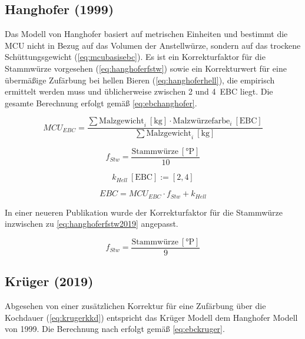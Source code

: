 \documentclass[a4paper,parskip=half]{scrartcl}
\newcommand{\MCUEBC}{\mathit{MCU}_{EBC}}
\newcommand{\EBC}{\mathit{EBC}}
\newcommand{\uebc}{\:[\textrm{EBC}]}
\newcommand{\ukg}{\:[\textrm{kg}]}
\newcommand{\uplato}{\:[\textrm{°P}]}
\newcommand{\fstw}{f_{Stw}}
\newcommand{\khell}{k_{Hell}}
\begin{document}
\subsection*{Hanghofer (1999)}

Das Modell von Hanghofer basiert auf metrischen Einheiten und bestimmt die MCU nicht in Bezug auf das Volumen der Anstellwürze, sondern auf das trockene Schüttungsgewicht (\autoref{eq:mcubasisebc}). Es ist ein Korrekturfaktor für die Stammwürze vorgesehen (\autoref{eq:hanghoferfstw}) sowie ein Korrekturwert für eine übermäßige Zufärbung bei hellen Bieren (\autoref{eq:hanghoferhell}), die empirisch ermittelt werden muss und üblicherweise zwischen 2 und 4~EBC liegt. Die gesamte Berechnung erfolgt gemäß \autoref{eq:ebchanghofer}. \parencite[76]{Hanghofer1999}

\begin{equation}
\MCUEBC = \frac{\sum \text{Malzgewicht}_i \ukg \cdot \text{Malzwürzefarbe}_i \uebc}{\sum \text{Malzgewicht}_i \ukg} 
\label{eq:mcubasisebc}
\end{equation}

\begin{equation}
\fstw = \frac{\text{Stammwürze} \uplato}{10}
\label{eq:hanghoferfstw}
\end{equation}

\begin{equation}
\khell \uebc := \left[2, 4 \right]
\label{eq:hanghoferhell}
\end{equation}

\begin{equation}
\EBC = \MCUEBC \cdot \fstw + \khell
\label{eq:ebchanghofer}
\end{equation}

In einer neueren Publikation wurde der Korrekturfaktor für die Stammwürze inzwischen zu \autoref{eq:hanghoferfstw2019} angepasst. \parencite[78]{Hanghofer2019}

\begin{equation}
\fstw = \frac{\text{Stammwürze} \uplato}{9}
\label{eq:hanghoferfstw2019}
\end{equation}

\subsection*{Krüger (2019)}

Abgesehen von einer zusätzlichen Korrektur für eine Zufärbung über die Kochdauer (\autoref{eq:krugerkkd}) entspricht das Krüger Modell dem Hanghofer Modell von 1999. Die Berechnung nach \textcite{Krueger2019} erfolgt gemäß \autoref{eq:ebckruger}.
\end{document}
